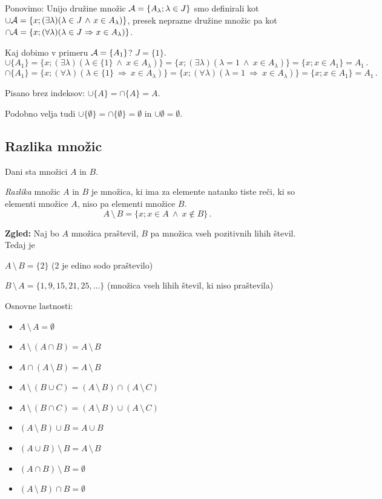 \documentclass[12pt,a4paper]{article}
\def\inn {{~\wedge~}}
\def\sledi {{~\Rightarrow~}}
\def\brez {{\,\setminus\,}}
\begin{document}
Ponovimo: Unijo družine množic ${\cal A} = \{A_\lambda; \lambda \in J\}$ smo definirali kot\\
$\cup {\cal A} = \{x;(\exists \lambda) (\lambda \in J\inn x\in A_\lambda)\}$, presek neprazne družine množic pa kot \\
\hbox{$\cap {\cal A} = \{x;(\forall \lambda) (\lambda \in J\sledi x\in A_\lambda)\}$.}

Kaj dobimo v primeru ${\cal A} = \{A_1\}$? $J= \{1\}$.
$$\cup \{A_1\}
= \{x;(\exists \lambda) (\lambda \in \{1\}\inn x\in A_\lambda)\}
= \{x;(\exists \lambda) (\lambda = 1 \inn x\in A_\lambda)\}
 = \{x;x\in A_1\} = A_1\,.$$
$$\cap \{A_1\} =
\{x;(\forall \lambda) (\lambda \in \{1\}\sledi x\in A_\lambda)\}
= \{x;(\forall \lambda)(\lambda= 1\sledi x\in A_\lambda)\}
 = \{x;x\in A_1\} = A_1\,.$$

Pisano brez indeksov: $\cup \{A\} = \cap \{A\} = A$.

Podobno velja tudi $\cup \{\emptyset\} = \cap \{\emptyset\} = \emptyset$ in $\cup \emptyset = \emptyset$.


\subsection*{Razlika množic}

Dani sta množici $A$ in $B$.

{\em Razlika} množic $A$ in $B$ je množica, ki ima za elemente natanko tiste reči, ki so elementi množice $A$, niso pa elementi množice $B$.
$$A\brez B = \{x; x\in A\inn x\not\in B\}\,.$$

{\bf Zgled:}
Naj bo $A$ množica praštevil, $B$ pa množica vseh pozitivnih lihih števil.
Tedaj je

$A\brez B = \{2\}$ (2 je edino sodo praštevilo)

$B\brez A = \{1,9,15,21,25,\ldots\}$ (množica vseh lihih števil, ki niso praštevila)

\bigskip

Osnovne lastnosti:

\begin{itemize}
  \item $A\brez A = \emptyset$

  \item $A\brez (A\cap B) = A\brez B$

  \item $A\cap (A\brez B) = A\brez B$

  \item $A\brez (B\cup C) = (A\brez B)\cap (A\brez C)$

  \item $A\brez (B\cap C) = (A\brez B)\cup (A\brez C)$

  \item $(A\brez B)\cup B = A\cup B$

  \item $(A\cup B)\brez B = A\brez B$

  \item $(A\cap B)\brez B = \emptyset$

  \item $(A\brez B)\cap B = \emptyset$
\end{itemize}
\end{document}
